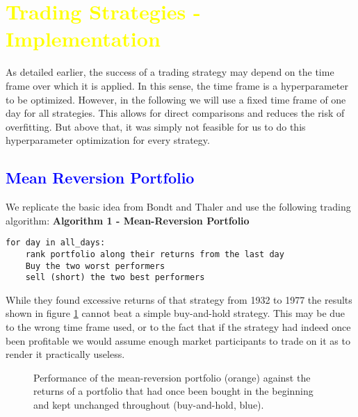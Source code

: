 \section{\textcolor{yellow}{Trading Strategies - Implementation}}
As detailed earlier, the success of a trading strategy may depend on the time frame over which it is applied. In this sense, the time frame is a hyperparameter to be optimized. However, in the following we will use a fixed time frame of one day for all strategies. This allows for direct comparisons and reduces the risk of overfitting. But above that, it was simply not feasible for us to do this hyperparameter optimization for every strategy. 

\subsection{\textcolor{blue}{Mean Reversion Portfolio}}
We replicate the basic idea from Bondt and Thaler \citet{bondt_does_1985} and use the following trading algorithm: 
\vspace{2ex}
\textbf{\small{Algorithm 1 - Mean-Reversion Portfolio}}
\vspace{-1ex}
\begin{verbatim}
for day in all_days: 
    rank portfolio along their returns from the last day
    Buy the two worst performers
    sell (short) the two best performers
\end{verbatim}

While they found excessive returns of that strategy from 1932 to 1977 the results shown in figure \ref{fig:mean reversion} cannot beat a simple buy-and-hold strategy. This may be due to the wrong time frame used, or to the fact that if the strategy had indeed once been profitable we would assume enough market participants to trade on it as to render it practically useless. 


\begin{figure}[h!]
    \centering
    \begin{adjustbox}{width=.95\textwidth,center}
        
    \end{adjustbox}  
    \caption{Performance of the mean-reversion portfolio (orange) against the returns of a portfolio that had once been bought in the beginning and kept unchanged throughout (buy-and-hold, blue).}
    \label{fig:mean reversion}
\end{figure}{}

